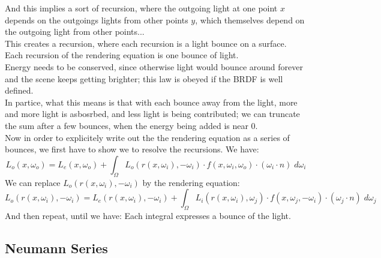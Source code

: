 \documentclass[12pt]{article}
\begin{document}
And this implies a sort of recursion,
where the outgoing light at one point $x$
depends on the outgoings lights from other points $y$,
which themselves depend on the outgoing light
from other points... \\
This creates a recursion, where each recursion
is a light bounce on a surface. \\

Each recursion of the rendering equation
is one bounce of light. \\
Energy needs to be conserved, since otherwise light would
bounce around forever and the scene keeps getting brighter;
this law is obeyed if the BRDF is well defined. \\
In partice, what this means is that with each bounce
away from the light, more and more light is asbosrbed,
and less light is being contributed; we can truncate
the sum after a few bounces, when the energy being
added is near $0$. \\

Now in order to explicitely write out the the rendering
equation as a series of bounces, we first have to
show we to resolve the recursions.
We have:
\[ L_{o}(x, \omega_o)
= L_{e}(x, \omega_o)
+ \int_\Omega L_o(r(x, \omega_i), -\omega_i)  \cdot
f(x, \omega_i, \omega_o) \cdot
(\omega_i \cdot n) \; d\omega_i \]
We can replace $L_o(r(x, \omega_i), -\omega_i)$
by the rendering equation:
\[ L_o(r(x, \omega_i), -\omega_i)
= L_{e}(r(x, \omega_i), -\omega_i)
+ \int_\Omega L_i(r(x, \omega_i), \omega_j) \cdot
f(x, \omega_j, -\omega_i) \cdot
(\omega_j \cdot n) \; d\omega_j \]
And then repeat, until we have:
Each integral expresses a bounce of the light. \\

\newpage

\subsection*{Neumann Series}
\end{document}
